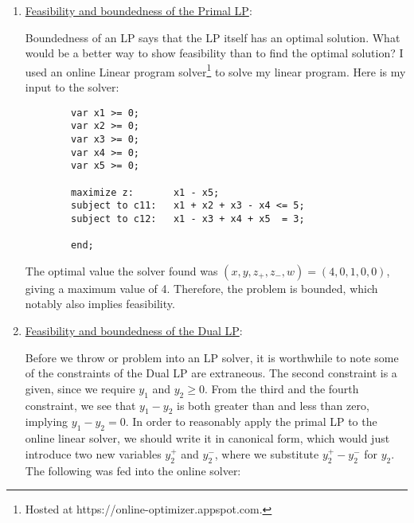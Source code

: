 \begin{solution}
\begin{enumerate}
\begin{multicols}{2}
        \columnbreak
        Where, 
        \begin{align*}
            &A\T = \mqty[1&1\\0&1\\-1&1\\1&-1\\-1&0], \ b = \mqty(5\\3), \ c = \mqty(1\\0\\0\\0\\-1)
        \end{align*}
        \end{multicols}
        Note the problem just asks for us to write just the Dual LP, not requiring us to write it in canonical form.  

        \item \underline{Feasibility and boundedness of the Primal LP}:

        \hop
        Boundedness of an LP says that the LP itself has an optimal solution. What would be a better way to show feasibility than to find the optimal solution? I used an online Linear program solver\footnote{Hosted at https://online-optimizer.appspot.com. } to solve my linear program. Here is my input to the solver:
        \begin{lstlisting}
        var x1 >= 0; 
        var x2 >= 0; 
        var x3 >= 0; 
        var x4 >= 0; 
        var x5 >= 0; 
        
        maximize z:       x1 - x5;
        subject to c11:   x1 + x2 + x3 - x4 <= 5;
        subject to c12:   x1 - x3 + x4 + x5  = 3;
        
        end;
        \end{lstlisting}
        The optimal value the solver found was $(x, y, z_+, z_-, w) = (4,0,1,0,0)$, giving a maximum value of 4. Therefore, the problem is bounded, which notably also implies feasibility. 

        \item \underline{Feasibility and boundedness of the Dual LP}:

        \hop
        Before we throw or problem into an LP solver, it is worthwhile to note some of the constraints of the Dual LP are extraneous. The second constraint is a given, since we require $y_1$ and $y_2 \geq 0$. From the third and the fourth constraint, we see that $y_1 - y_2$ is both greater than and less than zero, implying $y_1 - y_2 = 0$. In order to reasonably apply the primal LP to the online linear solver, we should write it in canonical form, which would just introduce two new variables $y_2^+$ and $y_2^-$, where we substitute $y_2^+ - y_2^-$ for $y_2$. The following was fed into the online solver:
        

\end{enumerate}
\end{solution}
